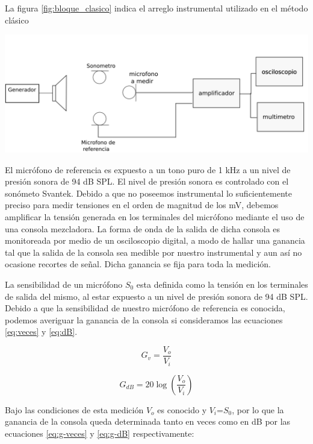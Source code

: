 \documentclass[]{article}
\makeatletter
\newenvironment{figurehere}   %
  {\def\@captype{figure}}   %
  {\par\medskip}
  {}              %
\makeatother
\begin{document}
\begin{multicols}{2}
La figura \ref{fig:bloque_clasico} indica el arreglo instrumental utilizado en el
método clásico

\begin{figurehere}
 \centering
 \includegraphics[width=\linewidth]{blockdiag}
 \label{fig:bloque_clasico}
\end{figurehere}

El micrófono de referencia es expuesto a un tono puro de 1 kHz a un nivel de
presión sonora de 94 dB SPL. El nivel de presión sonora es controlado con el
sonómeto Svantek. Debido a que no poseemos instrumental lo suficientemente
preciso para medir tensiones en el orden de magnitud de los mV, debemos amplificar
la tensión generada en los terminales del micrófono mediante el uso de una
consola mezcladora. La forma de onda de la salida de dicha consola es monitoreada
por medio de un osciloscopio digital, a modo de hallar una ganancia tal que la
salida de la consola sea medible por nuestro instrumental y
aun así no ocasione recortes de señal. Dicha ganancia se fija para toda la medición.

La sensibilidad de un micrófono $S_0$ esta definida como la tensión en los terminales
de salida del mismo, al estar expuesto a un nivel de presión sonora de 94 dB SPL.
Debido a que la sensibilidad de nuestro micrófono de referencia es conocida,
podemos averiguar la ganancia de la consola si consideramos las ecuaciones
\ref{eq:veces} y \ref{eq:dB}.

\begin{equation}
  G_v=\frac{V_o}{V_i}
  \label{eq:veces}
\end{equation}

\begin{equation}
  G_{dB}= 20 \log \left(\frac{V_o}{V_i}\right)
  \label{eq:dB}
\end{equation}

Bajo las condiciones de esta medición $V_o$ es conocido y $V_i$=$S_0$, por lo que
la ganancia de la consola queda determinada tanto en veces como en dB por las ecuaciones
\ref{eq:g-veces} y \ref{eq:g-dB} respectivamente:


\end{multicols}
\end{document}
